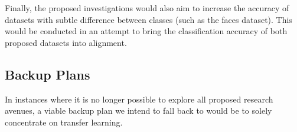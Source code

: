 \documentclass{article}
\begin{document}
Finally, the proposed investigations would also aim to increase the accuracy of datasets with subtle difference between classes (such as the faces dataset). This would be conducted in an attempt to bring the classification accuracy of both proposed datasets into alignment.

\subsection{Backup Plans}
\label{sec:plans}

In instances where it is no longer possible to explore all proposed research avenues, a viable backup plan we intend to fall back to would be to solely concentrate on transfer learning. 



\end{document}
